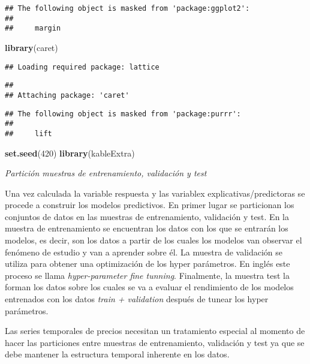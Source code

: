 \documentclass[]{article}
\newenvironment{Shaded}{\begin{snugshade}}{\end{snugshade}}
\newcommand{\KeywordTok}[1]{\textcolor[rgb]{0.13,0.29,0.53}{\textbf{#1}}}
\newcommand{\DecValTok}[1]{\textcolor[rgb]{0.00,0.00,0.81}{#1}}
\newcommand{\NormalTok}[1]{#1}
\begin{document}
\begin{verbatim}
## The following object is masked from 'package:ggplot2':
## 
##     margin
\end{verbatim}

\begin{Shaded}
\begin{Highlighting}[]
\KeywordTok{library}\NormalTok{(caret)}
\end{Highlighting}
\end{Shaded}

\begin{verbatim}
## Loading required package: lattice
\end{verbatim}

\begin{verbatim}
## 
## Attaching package: 'caret'
\end{verbatim}

\begin{verbatim}
## The following object is masked from 'package:purrr':
## 
##     lift
\end{verbatim}

\begin{Shaded}
\begin{Highlighting}[]
\KeywordTok{set.seed}\NormalTok{(}\DecValTok{420}\NormalTok{)}
\KeywordTok{library}\NormalTok{(kableExtra)}
\end{Highlighting}
\end{Shaded}

\emph{Partición muestras de entrenamiento, validación y test}

Una vez calculada la variable respuesta y las variablex
explicativas/predictoras se procede a construir los modelos predictivos.
En primer lugar se particionan los conjuntos de datos en las muestras de
entrenamiento, validación y test. En la muestra de entrenamiento se
encuentran los datos con los que se entrarán los modelos, es decir, son
los datos a partir de los cuales los modelos van observar el fenómeno de
estudio y van a aprender sobre él. La muestra de validación se utiliza
para obtener una optimización de los hyper parámetros. En inglés este
proceso se llama \emph{hyper-parameter fine tunning}. Finalmente, la
muestra test la forman los datos sobre los cuales se va a evaluar el
rendimiento de los modelos entrenados con los datos \emph{train +
validation} después de tunear los hyper parámetros.

\setlength\parskip{5ex} Las series temporales de precios necesitan un
tratamiento especial al momento de hacer las particiones entre muestras
de entrenamiento, validación y test ya que se debe mantener la
estructura temporal inherente en los datos.
\end{document}
